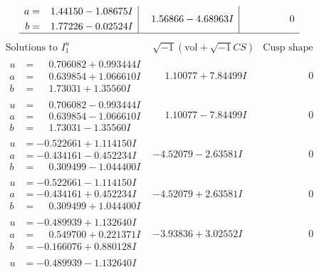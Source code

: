 \documentclass[1p]{elsarticle_modified}
\theoremstyle{definition}
\newcommand{\I}{\sqrt{-1}}
\begin{document}
$$\begin{array}{c|c|c}
\begin{aligned}
a &= \phantom{-}1.44150 - 1.08675 I \\
b &= \phantom{-}1.77226 - 0.02524 I\end{aligned}
 & \phantom{-}1.56866 - 4.68963 I & \phantom{-0.000000 } 0\\
 \hline 
 \end{array}$$\newpage$$\begin{array}{c|c|c}  
\text{Solutions to }I^u_{1}& \I (\text{vol} + \sqrt{-1}CS) & \text{Cusp shape}\\
 \hline 
\begin{aligned}
u &= \phantom{-}0.706082 + 0.993444 I \\
a &= \phantom{-}0.639854 + 1.066610 I \\
b &= \phantom{-}1.73031 + 1.35560 I\end{aligned}
 & \phantom{-}1.10077 + 7.84499 I & \phantom{-0.000000 } 0 \\ \hline\begin{aligned}
u &= \phantom{-}0.706082 - 0.993444 I \\
a &= \phantom{-}0.639854 - 1.066610 I \\
b &= \phantom{-}1.73031 - 1.35560 I\end{aligned}
 & \phantom{-}1.10077 - 7.84499 I & \phantom{-0.000000 } 0 \\ \hline\begin{aligned}
u &= -0.522661 + 1.114150 I \\
a &= -0.434161 - 0.452234 I \\
b &= \phantom{-}0.309499 - 1.044400 I\end{aligned}
 & -4.52079 - 2.63581 I & \phantom{-0.000000 } 0 \\ \hline\begin{aligned}
u &= -0.522661 - 1.114150 I \\
a &= -0.434161 + 0.452234 I \\
b &= \phantom{-}0.309499 + 1.044400 I\end{aligned}
 & -4.52079 + 2.63581 I & \phantom{-0.000000 } 0 \\ \hline\begin{aligned}
u &= -0.489939 + 1.132640 I \\
a &= \phantom{-}0.549700 + 0.221371 I \\
b &= -0.166076 + 0.880128 I\end{aligned}
 & -3.93836 + 3.02552 I & \phantom{-0.000000 } 0 \\ \hline\begin{aligned}
u &= -0.489939 - 1.132640 I \\

\end{aligned}
\end{array}$$
\end{document}
